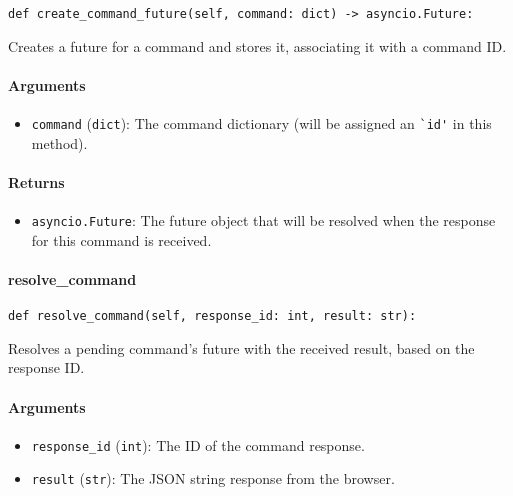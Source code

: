 \documentclass{article}
\begin{document}
\begin{lstlisting}[style=pythonstyle]
def create_command_future(self, command: dict) -> asyncio.Future:
\end{lstlisting}

\noindent Creates a future for a command and stores it, associating it with a command ID.

\paragraph{Arguments}

\begin{itemize}
    \item \lstinline[style=pythonstyle]|command| (\lstinline[style=pythonstyle]|dict|): The command dictionary (will be assigned an \lstinline[style=pythonstyle]|`id'| in this method).
\end{itemize}

\paragraph{Returns}

\begin{itemize}
    \item \lstinline[style=pythonstyle]|asyncio.Future|: The future object that will be resolved when the response for this command is received.
\end{itemize}

\paragraph{resolve\_command}

\begin{lstlisting}[style=pythonstyle]
def resolve_command(self, response_id: int, result: str):
\end{lstlisting}

\noindent Resolves a pending command's future with the received result, based on the response ID.

\paragraph{Arguments}

\begin{itemize}
    \item \lstinline[style=pythonstyle]|response_id| (\lstinline[style=pythonstyle]|int|): The ID of the command response.
    \item \lstinline[style=pythonstyle]|result| (\lstinline[style=pythonstyle]|str|): The JSON string response from the browser.
\end{itemize}
\end{document}
